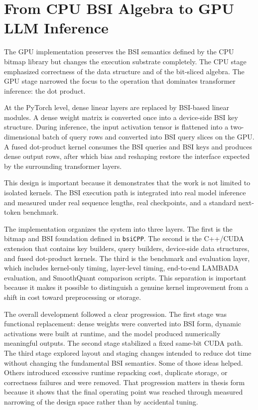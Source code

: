 \section{From CPU BSI Algebra to GPU LLM Inference}\label{sec:cpu-to-gpu}
The GPU implementation preserves the BSI semantics defined by the CPU bitmap library but changes the execution substrate completely. The CPU stage emphasized correctness of the data structure and of the bit-sliced algebra. The GPU stage narrowed the focus to the operation that dominates transformer inference: the dot product.

At the PyTorch level, dense linear layers are replaced by BSI-based linear modules. A dense weight matrix is converted once into a device-side BSI key structure. During inference, the input activation tensor is flattened into a two-dimensional batch of query rows and converted into BSI query slices on the GPU. A fused dot-product kernel consumes the BSI queries and BSI keys and produces dense output rows, after which bias and reshaping restore the interface expected by the surrounding transformer layers.

This design is important because it demonstrates that the work is not limited to isolated kernels. The BSI execution path is integrated into real model inference and measured under real sequence lengths, real checkpoints, and a standard next-token benchmark.

The implementation organizes the system into three layers. The first is the bitmap and BSI foundation defined in \texttt{bsiCPP}. The second is the C++/CUDA extension that contains key builders, query builders, device-side data structures, and fused dot-product kernels. The third is the benchmark and evaluation layer, which includes kernel-only timing, layer-level timing, end-to-end LAMBADA evaluation, and SmoothQuant comparison scripts. This separation is important because it makes it possible to distinguish a genuine kernel improvement from a shift in cost toward preprocessing or storage.

The overall development followed a clear progression. The first stage was functional replacement: dense weights were converted into BSI form, dynamic activations were built at runtime, and the model produced numerically meaningful outputs. The second stage stabilized a fixed same-bit CUDA path. The third stage explored layout and staging changes intended to reduce dot time without changing the fundamental BSI semantics. Some of those ideas helped. Others introduced excessive runtime repacking cost, duplicate storage, or correctness failures and were removed. That progression matters in thesis form because it shows that the final operating point was reached through measured narrowing of the design space rather than by accidental tuning.


